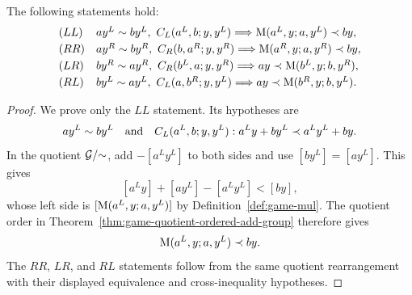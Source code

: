 \begin{lemma}
  \label{lem:mulopt-bounds}
  \leanok
  The following statements hold:
  \[
    \begin{array}{ll}
      (LL)&ay^L\sim by^L,\ C_L(a^L,b;y,y^L)
        \Longrightarrow \operatorname{M}(a^L,y;a,y^L)\prec by,\\[1mm]
      (RR)&ay^R\sim by^R,\ C_R(b,a^R;y,y^R)
        \Longrightarrow \operatorname{M}(a^R,y;a,y^R)\prec by,\\[1mm]
      (LR)&by^R\sim ay^R,\ C_R(b^L,a;y,y^R)
        \Longrightarrow ay\prec\operatorname{M}(b^L,y;b,y^R),\\[1mm]
      (RL)&by^L\sim ay^L,\ C_L(a,b^R;y,y^L)
        \Longrightarrow ay\prec\operatorname{M}(b^R,y;b,y^L).
    \end{array}
  \]
\end{lemma}
\begin{proof}
  \leanok
  We prove only the \(LL\) statement.  Its hypotheses are
  \[
    ay^L\sim by^L
    \quad\text{and}\quad
    C_L(a^L,b;y,y^L):
    a^Ly+by^L\prec a^Ly^L+by.
  \]
  In the quotient \(\mathcal G/{\sim}\), add \(-[a^Ly^L]\) to both sides and use
  \([by^L]=[ay^L]\).  This gives
  \[
    [a^Ly]+[ay^L]-[a^Ly^L]<[by],
  \]
  whose left side is \([\operatorname{M}(a^L,y;a,y^L)]\) by
  Definition~\ref{def:game-mul}.  The quotient order in
  Theorem~\ref{thm:game-quotient-ordered-add-group} therefore gives
  \[
    \operatorname{M}(a^L,y;a,y^L)\prec by.
  \]
  The \(RR\), \(LR\), and \(RL\) statements follow from the same quotient
  rearrangement with their displayed equivalence and cross-inequality hypotheses.
\end{proof}

